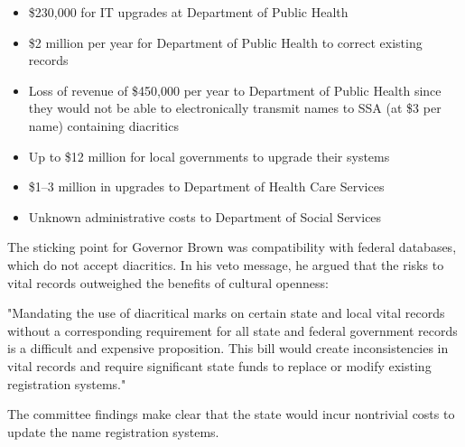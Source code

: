 \begin{itemize}

\item \$230,000 for IT upgrades at Department of Public Health
\item \$2 million per year for Department of Public Health to correct existing
records
\item Loss of revenue of \$450,000 per year to Department of Public Health since
they would not be able to electronically transmit names to SSA (at \$3 per name)
containing diacritics
\item Up to \$12 million for local governments to upgrade their systems
\item \$1--3 million in upgrades to Department of Health Care Services
\item Unknown administrative costs to Department of Social Services

\end{itemize}

The sticking point for Governor Brown was compatibility with federal databases,
which do not accept diacritics. In his veto message, he argued that the risks to
vital records outweighed the benefits of cultural openness:

"Mandating the use of diacritical marks on certain state and local vital records
without a corresponding requirement for all state and federal government records
is a difficult and expensive proposition. This bill would create inconsistencies
in vital records and require significant state funds to replace or modify
existing registration systems."

The committee findings make clear that the state would incur nontrivial costs to
update the name registration systems.
